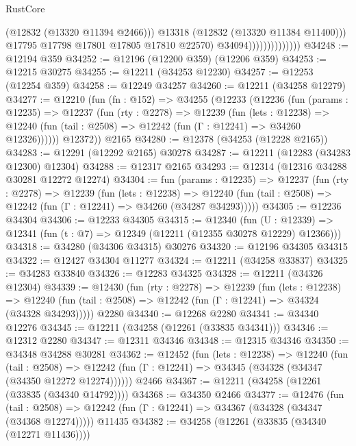 \begin{lexlean}{RustCore}
\begin{coremodule}
                                      (@12832 (@13320 @11394 @2466)))
                                    @13318
                                    (@12832 (@13320 @11384 @11400)))
                                  @17795
                                  @17798
                                  @17801
                                  @17805
                                  @17810
                                  @22570)
                                @34094))))))))))))))
@34248 := @12194 @359
@34252 := @12196 (@12200 @359) (@12206 @359)
@34253 := @12215 @30275
@34255 := @12211 (@34253 @12230)
@34257 := @12253 (@12254 @359)
@34258 := @12249 @34257
@34260 := @12211 (@34258 @12279)
@34277 := @12210
    (fun (fn : @152) =>
    @34255
      (@12233
        (@12236
          (fun (params : @12235) =>
          @12237
            (fun (rty : @2278) =>
            @12239
              (fun (lets : @12238) =>
              @12240 (fun (tail : @2508) => @12242 (fun (Γ : @12241) => @34260 @12326))))))
        @12372))
    @2165
@34280 := @12378 (@34253 (@12228 @2165))
@34283 := @12291 (@12292 @2165) @30278
@34287 := @12211 (@12283 (@34283 @12300) @12304)
@34288 := @12317 @2165
@34293 := @12314 (@12316 @34288 @30281 @12272 @12274)
@34304 := fun (params : @12235) =>
  @12237
    (fun (rty : @2278) =>
    @12239
      (fun (lets : @12238) =>
      @12240 (fun (tail : @2508) => @12242 (fun (Γ : @12241) => @34260 (@34287 @34293)))))
@34305 := @12236 @34304
@34306 := @12233 @34305
@34315 := @12340
    (fun (U : @12339) => @12341 (fun (t : @7) => @12349 (@12211 (@12355 @30278 @12229) @12366)))
@34318 := @34280 (@34306 @34315) @30276
@34320 := @12196 @34305 @34315
@34322 := @12427 @34304 @11277
@34324 := @12211 (@34258 @33837)
@34325 := @34283 @33840
@34326 := @12283 @34325
@34328 := @12211 (@34326 @12304)
@34339 := @12430
    (fun (rty : @2278) =>
    @12239
      (fun (lets : @12238) =>
      @12240 (fun (tail : @2508) => @12242 (fun (Γ : @12241) => @34324 (@34328 @34293)))))
    @2280
@34340 := @12268 @2280
@34341 := @34340 @12276
@34345 := @12211 (@34258 (@12261 (@33835 @34341)))
@34346 := @12312 @2280
@34347 := @12311 @34346
@34348 := @12315 @34346
@34350 := @34348 @34288 @30281
@34362 := @12452
    (fun (lets : @12238) =>
    @12240
      (fun (tail : @2508) =>
      @12242 (fun (Γ : @12241) => @34345 (@34328 (@34347 (@34350 @12272 @12274))))))
    @2466
@34367 := @12211 (@34258 (@12261 (@33835 (@34340 @14792))))
@34368 := @34350 @2466
@34377 := @12476
    (fun (tail : @2508) => @12242 (fun (Γ : @12241) => @34367 (@34328 (@34347 (@34368 @12274)))))
    @11435
@34382 := @34258 (@12261 (@33835 (@34340 (@12271 @11436))))

\end{coremodule}
\end{lexlean}
